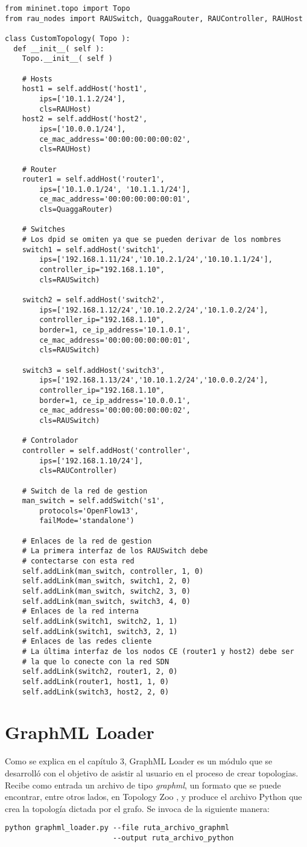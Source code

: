 \begin{verbatim}
from mininet.topo import Topo
from rau_nodes import RAUSwitch, QuaggaRouter, RAUController, RAUHost

class CustomTopology( Topo ):
  def __init__( self ):
	Topo.__init__( self )

	# Hosts
	host1 = self.addHost('host1',
		ips=['10.1.1.2/24'],
		cls=RAUHost)
	host2 = self.addHost('host2',
		ips=['10.0.0.1/24'],
		ce_mac_address='00:00:00:00:00:02',
		cls=RAUHost)
	
	# Router	
	router1 = self.addHost('router1',
		ips=['10.1.0.1/24', '10.1.1.1/24'],
		ce_mac_address='00:00:00:00:00:01',
		cls=QuaggaRouter)
		
	# Switches
	# Los dpid se omiten ya que se pueden derivar de los nombres
	switch1 = self.addHost('switch1',
		ips=['192.168.1.11/24','10.10.2.1/24','10.10.1.1/24'],
		controller_ip="192.168.1.10",
		cls=RAUSwitch)

	switch2 = self.addHost('switch2',
		ips=['192.168.1.12/24','10.10.2.2/24','10.1.0.2/24'],
		controller_ip="192.168.1.10",
		border=1, ce_ip_address='10.1.0.1',
		ce_mac_address='00:00:00:00:00:01',
		cls=RAUSwitch)
		
	switch3 = self.addHost('switch3',
		ips=['192.168.1.13/24','10.10.1.2/24','10.0.0.2/24'],
		controller_ip="192.168.1.10",
		border=1, ce_ip_address='10.0.0.1',
		ce_mac_address='00:00:00:00:00:02',
		cls=RAUSwitch)
		
	# Controlador
	controller = self.addHost('controller',
		ips=['192.168.1.10/24'],
		cls=RAUController)
		
	# Switch de la red de gestion
	man_switch = self.addSwitch('s1',
		protocols='OpenFlow13',
		failMode='standalone')
		
	# Enlaces de la red de gestion
	# La primera interfaz de los RAUSwitch debe
	# contectarse con esta red
	self.addLink(man_switch, controller, 1, 0)
	self.addLink(man_switch, switch1, 2, 0)
	self.addLink(man_switch, switch2, 3, 0)
	self.addLink(man_switch, switch3, 4, 0)
	# Enlaces de la red interna
	self.addLink(switch1, switch2, 1, 1)
	self.addLink(switch1, switch3, 2, 1)
	# Enlaces de las redes cliente
	# La última interfaz de los nodos CE (router1 y host2) debe ser
	# la que lo conecte con la red SDN
	self.addLink(switch2, router1, 2, 0)
	self.addLink(router1, host1, 1, 0)	
	self.addLink(switch3, host2, 2, 0)
\end{verbatim}


\section{GraphML Loader}
Como se explica en el capítulo 3, GraphML Loader es un módulo que se desarrolló con el objetivo de asistir al usuario en el proceso de crear topologias. Recibe como entrada un archivo de tipo \textit{graphml}, un formato que se puede encontrar, entre otros lados, en Topology Zoo \cite{topology-zoo}, y produce el archivo Python que crea la topología dictada por el grafo. Se invoca de la siguiente manera:
\begin{lstlisting}
python graphml_loader.py --file ruta_archivo_graphml
                         --output ruta_archivo_python
\end{lstlisting}

